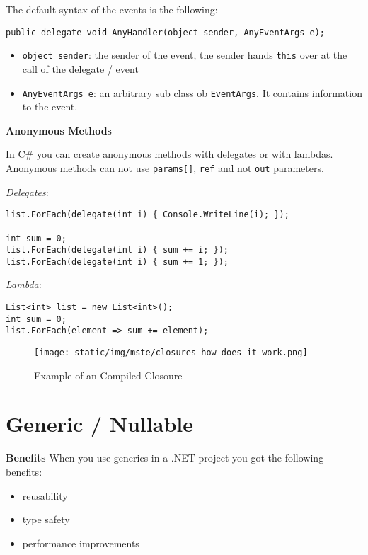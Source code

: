 \documentclass[11pt,twoside,landscape]{article}
\begin{document}
\begin{multicols}{3}
The default syntax of the events is the following:
\lstset{language=csharp,label= ,caption= ,captionpos=b,numbers=none}
\begin{lstlisting}
public delegate void AnyHandler(object sender, AnyEventArgs e);
\end{lstlisting}

\begin{itemize}
\item \texttt{object sender}: the sender of the event, the sender hands \texttt{this} over at the call of the delegate / event
\item \texttt{AnyEventArgs e}: an arbitrary sub class ob \texttt{EventArgs}. It contains information to the event.
\end{itemize}


\textbf{Anonymous Methods}

In \href{../../../roam/20211003114158-c.org}{C\#} you can create anonymous methods with delegates or with lambdas.
Anonymous methods can not use \texttt{params[]}, \texttt{ref} and not \texttt{out} parameters.

\emph{Delegates}:
\lstset{language=csharp,label= ,caption= ,captionpos=b,numbers=none}
\begin{lstlisting}
list.ForEach(delegate(int i) { Console.WriteLine(i); });

int sum = 0;
list.ForEach(delegate(int i) { sum += i; });
list.ForEach(delegate(int i) { sum += 1; });
\end{lstlisting}

\emph{Lambda}:
\lstset{language=csharp,label= ,caption= ,captionpos=b,numbers=none}
\begin{lstlisting}
List<int> list = new List<int>();
int sum = 0;
list.ForEach(element => sum += element);
\end{lstlisting}

\begin{figure}[htbp]
\centering
\texttt{[image: static/img/mste/closures\_how\_does\_it\_work.png]}
\caption{\label{fig:org32b98f1}Example of an Compiled Closoure}
\end{figure}

\section{Generic / Nullable}
\label{sec:org655c15b}

\textbf{Benefits}
When you use generics in a .NET project you got the following benefits:
\begin{itemize}
\item reusability
\item type safety
\item performance improvements
\end{itemize}



\end{multicols}
\end{document}
